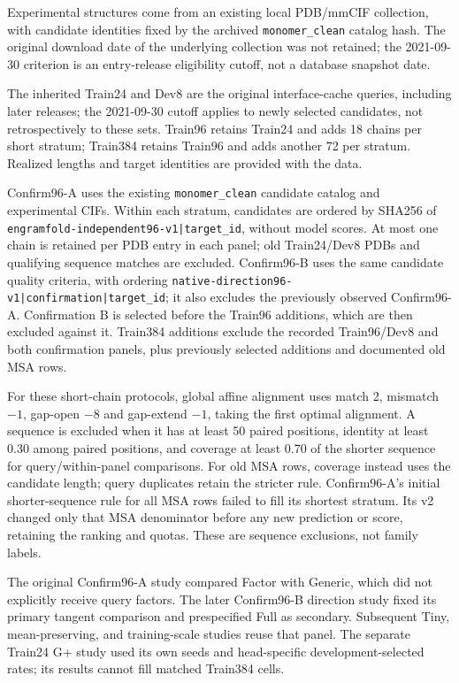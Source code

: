 Experimental structures come from an existing local PDB/mmCIF collection,
with candidate identities fixed by the archived \texttt{monomer\_clean}
catalog hash. The original download date of the underlying collection was
not retained; the 2021-09-30 criterion is an entry-release eligibility cutoff,
not a database snapshot date.

The inherited Train24 and Dev8 are the original interface-cache queries,
including later releases; the 2021-09-30 cutoff applies to newly selected
candidates, not retrospectively to these sets. Train96 retains Train24 and adds
18 chains per short stratum; Train384 retains Train96 and adds another 72 per
stratum. Realized lengths and target identities are provided with the data.

Confirm96-A uses the existing \texttt{monomer\_clean} candidate catalog and
experimental CIFs. Within each stratum, candidates are ordered by SHA256 of
\texttt{engramfold-independent96-v1|target\_id}, without model scores.
At most one chain is retained per PDB entry in each panel; old Train24/Dev8 PDBs and qualifying sequence
matches are excluded. Confirm96-B uses the same candidate quality criteria,
with ordering \texttt{native-direction96-v1|confirmation|target\_id}; it also
excludes the previously observed Confirm96-A. Confirmation B is selected
before the Train96 additions, which are then excluded against it. Train384
additions exclude the recorded Train96/Dev8 and both confirmation panels,
plus previously selected additions and documented old MSA rows.

For these short-chain protocols, global affine alignment uses match 2,
mismatch $-1$, gap-open $-8$ and gap-extend $-1$, taking the first optimal
alignment. A sequence is excluded when it has at least 50 paired positions,
identity at least 0.30 among paired positions, and coverage at least 0.70 of
the shorter sequence for query/within-panel comparisons. For old MSA rows,
coverage instead uses the candidate length; query duplicates retain the
stricter rule. Confirm96-A's initial shorter-sequence rule for all MSA rows
failed to fill its shortest stratum. Its v2 changed only that MSA denominator
before any new prediction or score, retaining the ranking and quotas. These
are sequence exclusions, not family labels.

The original Confirm96-A study compared Factor with Generic, which did not
explicitly receive query factors. The later Confirm96-B direction study fixed
its primary tangent comparison and prespecified Full as secondary. Subsequent
Tiny, mean-preserving, and training-scale studies reuse that panel.
The separate Train24 G+ study used its own seeds and head-specific
development-selected rates; its results cannot fill matched Train384 cells.

